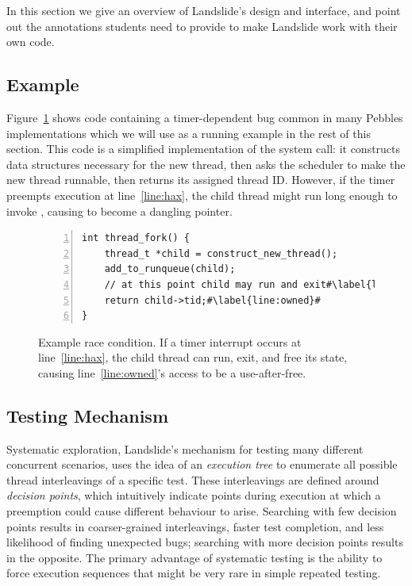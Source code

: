 In this section we give an overview of Landslide's design and interface, and point out the annotations students need to provide to make Landslide work with their own code.

\subsection{Example}

Figure~\ref{fig:threadfork} shows code containing a timer-dependent bug common in many Pebbles implementations which we will use as a running example in the rest of this section.
This code is a simplified implementation of the  system call: it constructs data structures necessary for the new thread, then asks the scheduler to make the new thread runnable, then returns its assigned thread ID.
However, if the timer preempts execution at line~\ref{line:hax}, the child thread might run long enough to invoke , causing  to become a dangling pointer.

\begin{figure}[t]
\small
\begin{lstlisting}[numbers=left]
int thread_fork() {
	thread_t *child = construct_new_thread();
	add_to_runqueue(child);
	// at this point child may run and exit#\label{line:hax}#
	return child->tid;#\label{line:owned}#
}
\end{lstlisting}
\caption{Example race condition. If a timer interrupt occurs at line~\ref{line:hax}, the child thread can run, exit, and free its state, causing line~\ref{line:owned}'s access to be a use-after-free.}
\label{fig:threadfork}
\end{figure}

\subsection{Testing Mechanism}

Systematic exploration, Landslide's mechanism for testing many different concurrent scenarios, uses the idea of an {\em execution tree} to enumerate all possible thread interleavings of a specific test. These interleavings are defined around {\em decision points}, which intuitively indicate points during execution at which a preemption could cause different behaviour to arise.
Searching with few decision points results in coarser-grained interleavings, faster test completion, and less likelihood of finding unexpected bugs; searching with more decision points results in the opposite.
The primary advantage of systematic testing is the ability to force execution sequences that might be very rare in simple repeated testing.

